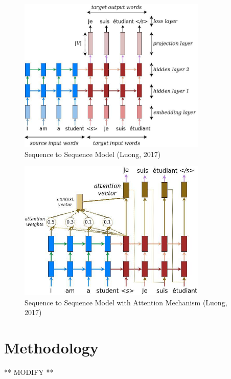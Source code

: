 \documentclass[10pt,a4paper]{article}
\begin{document}
\clearpage

\begin{figure}
  \begin{center}
    \includegraphics[width=0.8\textwidth]{seq2seq.jpg}
    \caption{Sequence to Sequence Model (Luong, 2017)}
  \end{center}
\end{figure}

\begin{figure}
  \begin{center}
    \includegraphics[width=0.8\textwidth] {attention_mechanism.jpg}
    \caption{Sequence to Sequence Model with Attention Mechanism (Luong, 2017)}
  \end{center}
\end{figure}

\clearpage

\section{Methodology}
** MODIFY **
\end{document}
